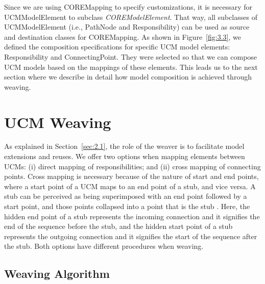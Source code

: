 Since we are using {\cls COREMapping} to specify customizations, it is necessary for {\cls UCMModelElement} to subclass \emph{\cls COREModelElement}. That way, all subclasses of {\cls UCMModelElement} (i.e., {\cls PathNode} and {\cls Responsibility}) can be used as source and destination classes for {\cls COREMapping}. As shown in Figure~\ref{fig:3.3}, we defined the composition specifications for specific UCM model elements: {\cls Responsibility} and {\cls ConnectingPoint}. They were selected so that we can compose UCM models based on the mappings of these elements. This leads us to the next section where we describe in detail how model composition is achieved through weaving.


\section{UCM Weaving} \label{sec:3.2}

As explained in Section~\ref{sec:2.1}, the role of the weaver is to facilitate model extensions and reuses. We offer two options when mapping elements between UCMs: (i) direct mapping of responsibilities; and (ii) cross mapping of connecting points. Cross mapping is necessary because of the nature of start and end points, where a start point of a UCM maps to an end point of a stub, and vice versa. A stub can be perceived as being superimposed with an end point followed by a start point, and those points collapsed into a point that is the stub \cite{buhr1995use}. Here, the hidden end point of a stub represents the incoming connection and it signifies the end of the sequence before the stub, and the hidden start point of a stub represents the outgoing connection and it signifies the start of the sequence after the stub. Both options have different procedures when weaving.

\subsection{Weaving Algorithm}

